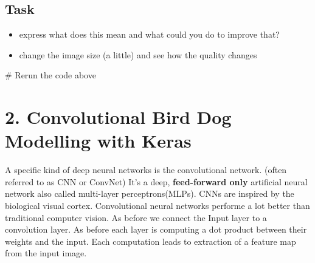 \documentclass[
  letterpaper,
  DIV=11,
  numbers=noendperiod]{scrartcl}
\newenvironment{Shaded}{\begin{snugshade}}{\end{snugshade}}
\newcommand{\CommentTok}[1]{\textcolor[rgb]{0.37,0.37,0.37}{#1}}
\providecommand{\tightlist}{%
  \setlength{\itemsep}{0pt}\setlength{\parskip}{0pt}}\usepackage{longtable,booktabs,array}
\begin{document}
\subsection{Task}\label{task}

\begin{itemize}
\tightlist
\item
  express what does this mean and what could you do to improve that?
\item
  change the image size (a little) and see how the quality changes
\end{itemize}

\begin{Shaded}
\begin{Highlighting}[]
\CommentTok{\# Rerun the code above}
\end{Highlighting}
\end{Shaded}

\section{2. Convolutional Bird Dog Modelling with
Keras}\label{convolutional-bird-dog-modelling-with-keras}

A specific kind of deep neural networks is the convolutional network.
(often referred to as CNN or ConvNet) It's a deep, \textbf{feed-forward
only} artificial neural network also called multi-layer
perceptrons(MLPs). CNNs are inspired by the biological visual cortex.
Convolutional neural networks performe a lot better than traditional
computer vision. As before we connect the Input layer to a convolution
layer. As before each layer is computing a dot product between their
weights and the input. Each computation leads to extraction of a feature
map from the input image.
\end{document}
